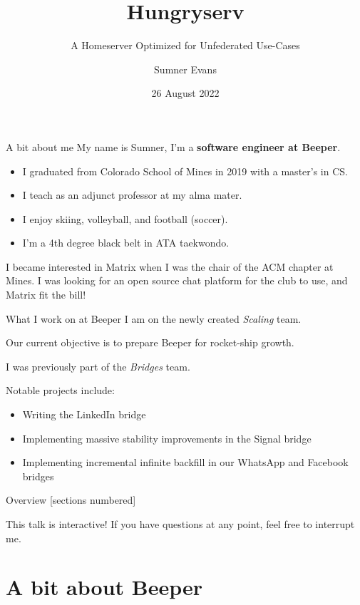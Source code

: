 \documentclass{beeper}
\title{Hungryserv}
\subtitle{A Homeserver Optimized for Unfederated Use-Cases}
\author{Sumner Evans}
\institute{Beeper}
\date{26 August 2022}
\begin{document}
\begin{frame}{A bit about me}
    My name is Sumner, I'm a \textbf{software engineer at Beeper}.
    \begin{itemize}
        \item I graduated from Colorado School of Mines in 2019 with a master's
            in CS.
        \item I teach as an adjunct professor at my alma mater.
        \item I enjoy skiing, volleyball, and football (soccer).
        \item I'm a 4th degree black belt in ATA taekwondo.
    \end{itemize}
    \pause

    I became interested in Matrix when I was the chair of the ACM chapter at
    Mines. I was looking for an open source chat platform for the club to use,
    and Matrix fit the bill!
\end{frame}

\begin{frame}{What I work on at Beeper}
    I am on the newly created \textit{Scaling} team.

    Our current objective is to prepare Beeper for rocket-ship growth.
    \pause

    I was previously part of the \textit{Bridges} team. 

    Notable projects include:
    \begin{itemize}
        \item Writing the LinkedIn bridge
        \item Implementing massive stability improvements in the Signal bridge
        \item Implementing incremental infinite backfill in our WhatsApp and
            Facebook bridges
    \end{itemize}
\end{frame}

\begin{frame}{Overview}
    [sections numbered]
    \tableofcontents[hideallsubsections]

    \begin{block}{This talk is interactive!}
        If you have questions at any point, feel free to interrupt me.
    \end{block}
\end{frame}

\section{A bit about Beeper}
\end{document}
